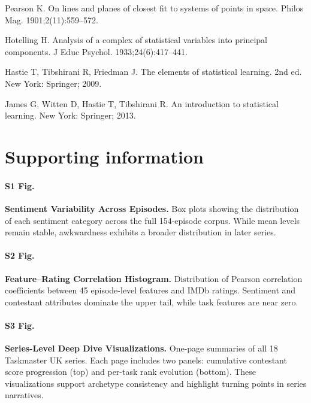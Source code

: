 \documentclass[10pt,letterpaper]{article}
\begin{document}
\begin{thebibliography}{22}
Pearson K.
\newblock On lines and planes of closest fit to systems of points in space.
\newblock Philos Mag. 1901;2(11):559--572.

Hotelling H.
\newblock Analysis of a complex of statistical variables into principal components.
\newblock J Educ Psychol. 1933;24(6):417--441.

Hastie T, Tibshirani R, Friedman J.
\newblock The elements of statistical learning. 2nd ed.
\newblock New York: Springer; 2009.

James G, Witten D, Hastie T, Tibshirani R.
\newblock An introduction to statistical learning.
\newblock New York: Springer; 2013.

\end{thebibliography}

\section*{Supporting information}

\paragraph*{S1 Fig.}
{\bf Sentiment Variability Across Episodes.} 
Box plots showing the distribution of each sentiment category across the full 154-episode corpus. While mean levels remain stable, awkwardness exhibits a broader distribution in later series.

\paragraph*{S2 Fig.}
{\bf Feature–Rating Correlation Histogram.} 
Distribution of Pearson correlation coefficients between 45 episode-level features and IMDb ratings. Sentiment and contestant attributes dominate the upper tail, while task features are near zero.

\paragraph*{S3 Fig.}
{\bf Series-Level Deep Dive Visualizations.}
One-page summaries of all 18 Taskmaster UK series. Each page includes two panels: cumulative contestant score progression (top) and per-task rank evolution (bottom). These visualizations support archetype consistency and highlight turning points in series narratives.
\end{document}
